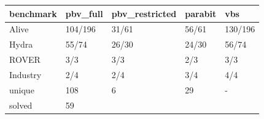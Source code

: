 \begin{tabular}{lllll}
\toprule
benchmark & pbv_full & pbv_restricted & parabit & vbs \\
\midrule
Alive & 104/196 & 31/61 & 56/61 & 130/196 \\
Hydra & 55/74 & 26/30 & 24/30 & 56/74 \\
ROVER & 3/3 & 3/3 & 2/3 & 3/3 \\
Industry & 2/4 & 2/4 & 3/4 & 4/4 \\
unique & 108 & 6 & 29 & - \\
solved & 59%
\bottomrule
\end{tabular}
